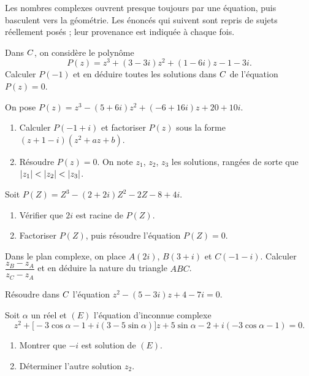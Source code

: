\begin{annales}
Les nombres complexes ouvrent presque toujours par une équation, puis
basculent vers la géométrie. Les énoncés qui suivent sont repris de sujets
réellement posés ; leur provenance est indiquée à chaque fois.

Dans $C$, on considère le polynôme
\[
  P(z) = z^{3}+(3-3i)z^{2}+(1-6i)z-1-3i .
\]
Calculer $P(-1)$ et en déduire toutes les solutions dans $C$ de l'équation
$P(z) = 0$.

On pose $P(z) = z^{3}-(5+6i)z^{2}+(-6+16i)z+20+10i$.
\begin{enumerate}[label=\textbf{\arabic*)}, leftmargin=*, itemsep=0.15em]
  \item Calculer $P(-1+i)$ et factoriser $P(z)$ sous la forme
        $(z+1-i)\left(z^{2}+az+b\right)$.
  \item Résoudre $P(z) = 0$. On note $z_{1}$, $z_{2}$, $z_{3}$ les solutions,
        rangées de sorte que $\left|z_{1}\right|<\left|z_{2}\right|<\left|z_{3}\right|$.
\end{enumerate}

Soit $P(Z) = Z^{3}-(2+2i)Z^{2}-2Z-8+4i$.
\begin{enumerate}[label=\textbf{\arabic*)}, leftmargin=*, itemsep=0.15em]
  \item Vérifier que $2i$ est racine de $P(Z)$.
  \item Factoriser $P(Z)$, puis résoudre l'équation $P(Z) = 0$.
\end{enumerate}

Dans le plan complexe, on place $A(2i)$, $B(3+i)$ et $C(-1-i)$. Calculer
$\dfrac{z_{B}-z_{A}}{z_{C}-z_{A}}$ et en déduire la nature du triangle $ABC$.

Résoudre dans $C$ l'équation
$z^{2}-(5-3i)z+4-7i = 0$.

Soit $\alpha$ un réel et $(E)$ l'équation d'inconnue complexe
\[
  z^{2}+\bigl[-3\cos\alpha-1+i(3-5\sin\alpha)\bigr]z
  +5\sin\alpha-2+i(-3\cos\alpha-1) = 0 .
\]
\begin{enumerate}[label=\textbf{\arabic*)}, leftmargin=*, itemsep=0.15em]
  \item Montrer que $-i$ est solution de $(E)$.
  \item Déterminer l'autre solution $z_{2}$.
\end{enumerate}


\end{annales}
